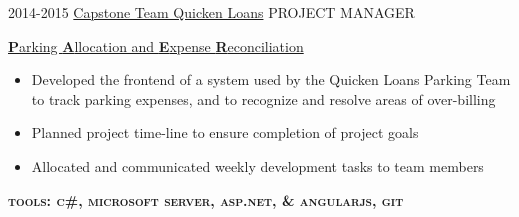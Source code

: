 \documentclass[]{friggeri-cv}
\begin{document}
\begin{entrylist}
\entry
    {2014-2015}
    {\href{http://www.quickenloans.com/}{Capstone Team Quicken Loans}}
    {PROJECT MANAGER}
    {\textcolor{gray}{} \hspace{2pt} 
      \href{http://www.capstone.cse.msu.edu/2015-01/projects/quicken-loans/}
           {{\bf P}arking {\bf A}llocation and {\bf E}xpense {\bf R}econciliation}
      \begin{itemize}[topsep=6pt,leftmargin=*,itemsep=6pt,align=left]
        \item{ Developed the frontend of a system used by the Quicken Loans Parking Team to
            track parking expenses, and to recognize and resolve areas of 
            over-billing}
        \item{
          Planned project time-line to ensure completion of project goals%
            }
        \item{ Allocated and communicated weekly development tasks to 
          team members}
      \end{itemize}
      \textbf{\textsc{tools: c\#, microsoft server, asp.net, \& angularjs, git}}
    }
\end{entrylist}
\end{document}
